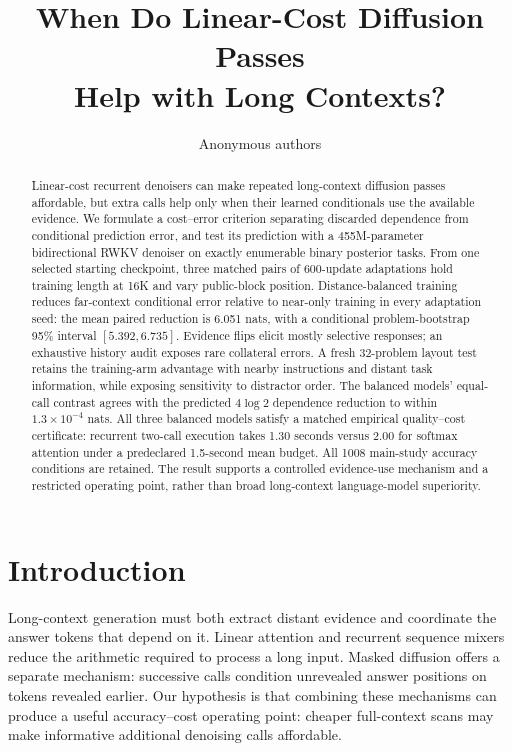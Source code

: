 \documentclass{article}
\title{When Do Linear-Cost Diffusion Passes\\Help with Long Contexts?}
\author{Anonymous authors}
\begin{document}
\maketitle
\begin{abstract}
Linear-cost recurrent denoisers can make repeated long-context diffusion
passes affordable, but extra calls help only when their learned conditionals
use the available evidence. We formulate a cost--error criterion separating
discarded dependence from conditional prediction error, and test its prediction
with a 455M-parameter bidirectional RWKV denoiser on exactly enumerable binary
posterior tasks. From one selected starting checkpoint, three matched pairs
of 600-update adaptations hold training length at 16K and vary public-block
position. Distance-balanced training reduces far-context conditional error
relative to near-only training in every adaptation seed: the mean paired
reduction is 6.051 nats, with a conditional problem-bootstrap 95\% interval
$[5.392,6.735]$. Evidence flips elicit mostly selective responses; an exhaustive
history audit exposes rare collateral errors. A fresh 32-problem layout test
retains the training-arm advantage with nearby instructions and distant task
information, while exposing sensitivity to distractor order. The balanced models'
equal-call contrast agrees with the predicted $4\log2$
dependence reduction to within $1.3\times10^{-4}$ nats. All three balanced
models satisfy a matched empirical quality--cost certificate: recurrent
two-call execution takes 1.30 seconds versus 2.00 for softmax attention under
a predeclared 1.5-second mean budget. All 1008 main-study accuracy conditions are retained.
The result supports a controlled evidence-use mechanism and a restricted
operating point, rather than broad long-context language-model superiority.
\end{abstract}

\section{Introduction}
Long-context generation must both extract distant evidence and coordinate the
answer tokens that depend on it. Linear attention and recurrent sequence mixers
reduce the arithmetic required to process a long input. Masked diffusion offers
a separate mechanism: successive calls condition unrevealed answer positions on
tokens revealed earlier. Our hypothesis is that combining these mechanisms can
produce a useful accuracy--cost operating point: cheaper full-context scans may
make informative additional denoising calls affordable.
\end{document}

